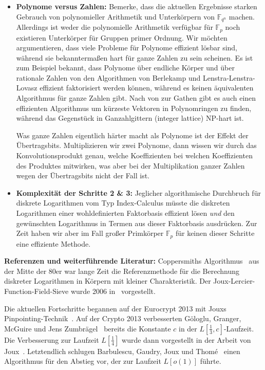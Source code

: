 \begin{refsegment}
\begin{itemize}
\item\textbf{Polynome versus Zahlen:} Bemerke, dass die aktuellen Ergebnisse starken Gebrauch von polynomieller Arithmetik und Unterkörpern von $\mathbb{F}_{q^n}$ machen. Allerdings ist weder die polynomielle Arithmetik verfügbar für $\mathbb{F}_p$ noch existieren Unterkörper für Gruppen primer Ordnung. Wir möchten argumentieren, dass viele Probleme für Polynome effizient lösbar sind, während sie bekanntermaßen hart für ganze Zahlen zu sein scheinen. Es ist zum Beispiel bekannt, dass Polynome über endliche Körper und über rationale Zahlen von den Algorithmen von Berlekamp und Lenstra-Lenstra-Lovasz effizient faktorisiert werden können, während es keinen äquivalenten Algorithmus für ganze Zahlen gibt. Nach von zur Gathen gibt es auch einen effizienten Algorithmus um kürzeste Vektoren in Polynomringen zu finden, während das Gegenstück in Ganzahlgittern (integer lattice) NP-hart ist.

Was ganze Zahlen eigentlich härter macht als Polynome ist der Effekt der Übertragsbits. Multiplizieren wir zwei Polynome, dann wissen wir durch das Konvolutionsprodukt genau, welche Koeffizienten bei welchen Koeffizienten des Produktes mitwirken, was aber bei der Multiplikation ganzer Zahlen wegen der Übertragsbits nicht der Fall ist.

\item\textbf{Komplexität der Schritte 2 \& 3:} Jeglicher algorithmische Durchbruch für diskrete Logarithmen vom Typ Index-Calculus müsste die diskreten Logarithmen einer wohldefinierten Faktorbasis effizient lösen {\em und} den gewünschten Logarithmus in Termen aus dieser Faktorbasis ausdrücken. Zur Zeit haben wir aber im Fall großer Primkörper $\mathbb{F}_p$ für keinen dieser Schritte eine effiziente Methode.
\end{itemize}

\textbf{Referenzen und weiterführende Literatur:}
Coppersmiths Algorithmus~\cite{Coppersmith1984} aus der Mitte der 80er war lange Zeit die Referenzmethode für die Berechnung diskreter Logarithmen in Körpern mit kleiner Charakteristik. Der Joux-Lercier-Function-Field-Sieve wurde 2006 in~\cite{JL2006} vorgestellt.

Die aktuellen Fortschritte begannen auf der Eurocrypt 2013 mit Jouxs Pinpointing-Tech\-nik~\cite{Pin2013}. Auf der Crypto 2013 verbesserten G\"ologlu, Granger, McGuire und Jens Zumbr\"agel~\cite{GGMZ2013} bereits die Konstante $c$ in der $L[\frac 1 3,c]$-Laufzeit. Die Verbesserung zur Laufzeit $L[\frac 1 4]$ wurde dann vorgestellt in der Arbeit von Joux~\cite{Joux2013}. Letztendlich schlugen Barbulescu, Gaudry, Joux und Thom{\'e}~\cite{BGJT2013} einen Algorithmus für den Abstieg vor, der zur Laufzeit $L[o(1)]$ führte.



\end{refsegment}
